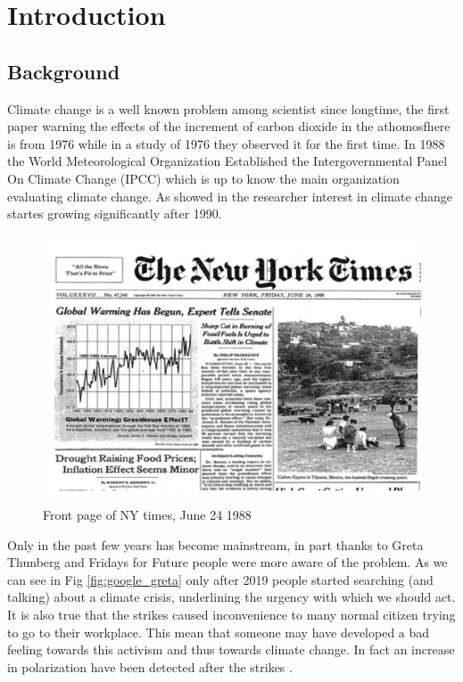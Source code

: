 
\chapter{Introduction}  %

\ifpdf
    \graphicspath{{Chapter1/Figs/Raster/}{Chapter1/Figs/PDF/}{Chapter1/Figs/}}
\else
    \graphicspath{{Chapter1/Figs/Vector/}{Chapter1/Figs/}}
\fi
\section{Background}
Climate change is a well known problem among scientist since longtime, the first paper warning the effects of the increment of carbon dioxide in the athomosfhere is from 1976 \cite{manabe_thermal_1967} while in a study of 1976 \cite{keeling_atmospheric_1976} they observed it for the first time. In 1988 the World Meteorological Organization Established the Intergovernmental Panel On Climate Change (IPCC) \cite{baker_1989} which is up to know the main organization evaluating climate change. As showed in \cite{santos_climate_2021} the researcher interest in climate change startes growing significantly after 1990. 

\begin{figure}[H]
    \centering
    \includegraphics[width=0.75\linewidth]{Chapter1/figures/global_warming copy.pdf}
    \caption{Front page of NY times, June 24 1988 }
    \label{fig:enter-label}
\end{figure}

Only in the past few years has become mainstream, in part thanks to Greta Thunberg \cite{sabherwal_greta_2021} and Fridays for Future people were more aware of the problem. As we can see in Fig \ref{fig:google_greta} only after 2019 people started searching (and talking) about a climate crisis, underlining  the urgency with which we should act. It is also true that the strikes caused inconvenience to many normal citizen trying to go to their workplace. This mean that someone may have developed a bad feeling towards this activism and thus towards climate change. In fact an increase in polarization have been detected after the strikes \cite{Falkenberg_climate_2022}.
\\


